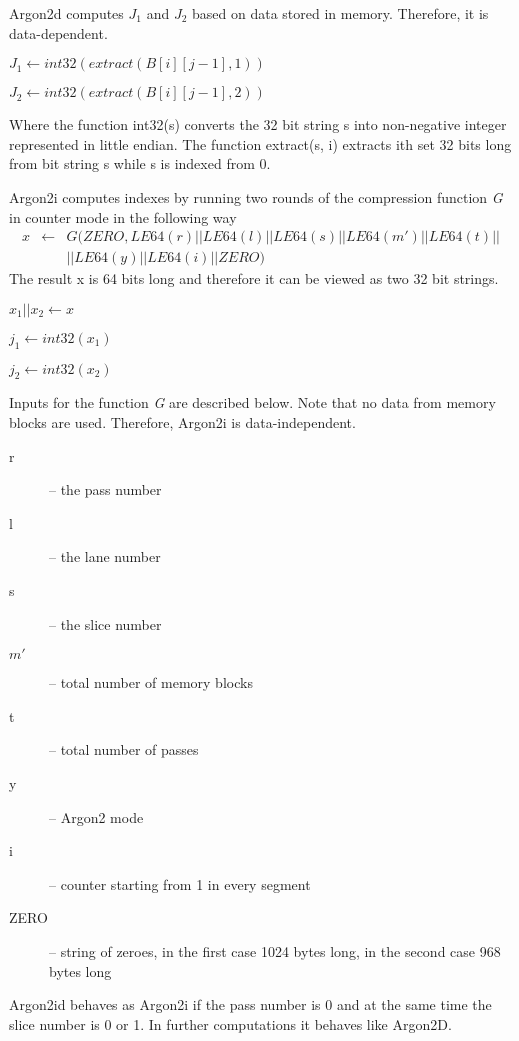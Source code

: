 \documentclass[nolof,digital]{fithesis3}
\begin{document}
Argon2d computes \(J_1\) and \(J_2\) based on data stored in memory. Therefore, it is data-dependent.

\(J_1 \leftarrow int32(extract(B[i][j-1], 1))\)

\(J_2 \leftarrow int32(extract(B[i][j-1], 2))\)

Where the function int32(s) converts the 32 bit string s into non-negative integer represented in little endian. The function extract(s, i) extracts ith set 32 bits long from bit string s while s is indexed from 0.

Argon2i computes indexes by running two rounds of the compression function \emph{G} in counter mode in the following way
\begin{eqnarray*}
x &\leftarrow& G(ZERO, LE64(r) || LE64(l) || LE64(s) || LE64(m') || LE64(t) ||\\
 && || LE64(y) || LE64(i) || ZERO) 
\end{eqnarray*}
The result x is 64 bits long and therefore it can be viewed as two 32 bit strings.

\(x_1 || x_2 \leftarrow x\)

\(j_1 \leftarrow int32(x_1)\)

\(j_2 \leftarrow int32(x_2)\)

Inputs for the function \emph{G} are described below. Note that no data from memory blocks are used. Therefore, Argon2i is data-independent.

\begin{description}
\item[r] -- the pass number

\item[l] -- the lane number

\item[s] -- the slice number

\item[\(m'\)] -- total number of memory blocks

\item[t] -- total number of passes

\item[y] -- Argon2 mode

\item[i] -- counter starting from 1 in every segment

\item[ZERO] -- string of zeroes, in the first case 1024 bytes long, in the second case 968 bytes long
\end{description}

Argon2id behaves as Argon2i if the pass number is 0 and at the same time the slice number is 0 or 1. In further computations it behaves like Argon2D.
\end{document}
